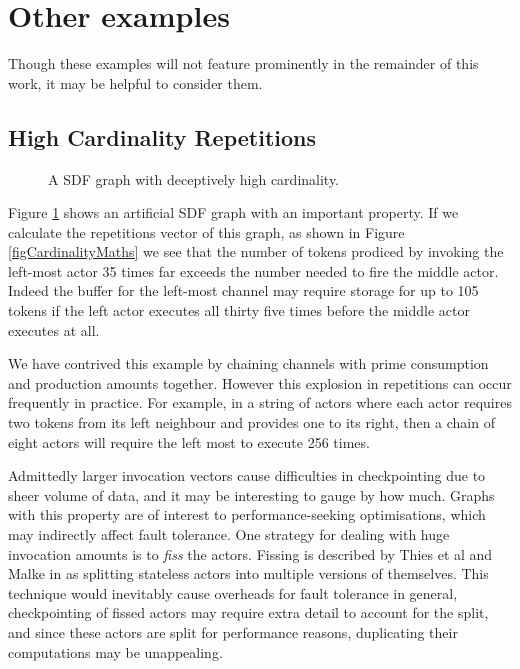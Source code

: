 \section{Other examples}

Though these examples will not feature prominently in the remainder of this work, it may be helpful to consider them.

\subsection{High Cardinality Repetitions}

\begin{figure}
\begin{center}
	
\caption{A SDF graph with deceptively high cardinality.}
\label{figCardinality}
\end{center}
\end{figure}

Figure \ref{figCardinality} shows an artificial SDF graph with an important property.
If we calculate the repetitions vector of this graph, as shown in Figure \ref{figCardinalityMaths} we see that the number of tokens prodiced by invoking the left-most actor 35 times far exceeds the number needed to fire the middle actor.
Indeed the buffer for the left-most channel may require storage for up to 105 tokens if the left actor executes all thirty five times before the middle actor executes at all.

We have contrived this example by chaining channels with prime consumption and production amounts together.
However this explosion in repetitions can occur frequently in practice.
For example, in a string of actors where each actor requires two tokens from its left neighbour and provides one to its right, then a chain of eight actors will require the left most to execute 256 times.

Admittedly larger invocation vectors cause difficulties in checkpointing due to sheer volume of data, and it may be interesting to gauge by how much.
Graphs with this property are of interest to performance-seeking optimisations, which may indirectly affect fault tolerance.
One strategy for dealing with huge invocation amounts is to {\em fiss} the actors.
Fissing is described by Thies et al and Malke in \cite{thies02, mal08} as splitting stateless actors into multiple versions of themselves.
This technique would inevitably cause overheads for fault tolerance in general, checkpointing of fissed actors may require extra detail to account for the split, and since these actors are split for performance reasons, duplicating their computations may be unappealing.

